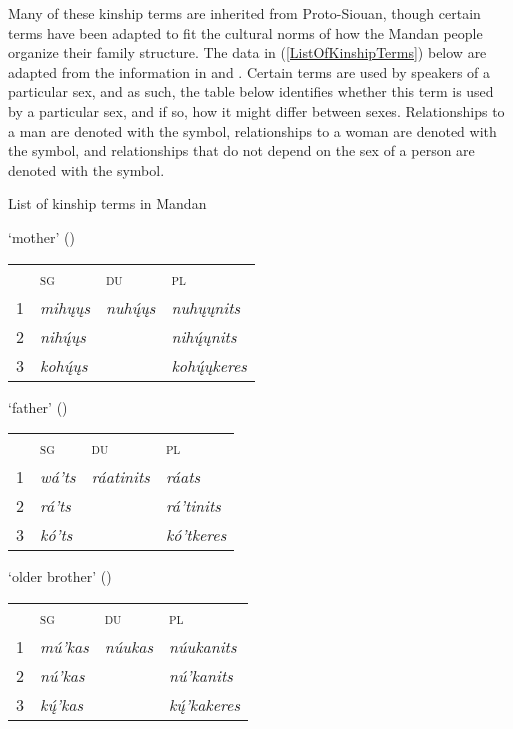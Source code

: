 Many of these kinship terms are inherited from Proto-Siouan, though certain terms have been adapted to fit the cultural norms of how the Mandan people organize their family structure. The data in (\ref{ListOfKinshipTerms}) below are adapted from the information in \citet[40ff]{bowers1950} and \citet[45]{mixco1997a}. Certain terms are used by speakers of a particular sex, and as such, the table below identifies whether this term is used by a particular sex, and if so, how it might differ between sexes. Relationships to a man are denoted with the {\Male} symbol, relationships to a woman are denoted with the {\Female} symbol, and relationships that do not depend on the sex of a person are denoted with the {\Hermaphrodite} symbol. 


\begin{exe}
\item\label{ListOfKinshipTerms} List of kinship terms in Mandan

\begin{xlist}

\item\label{ListOfKinshipTerms1} `mother' (\Hermaphrodite)

    \begin{tabular}{llll}
    ~ &\textsc{sg}&\textsc{du}& \textsc{pl}\\
    1&  \textit{mihųųs}&\textit{nuhų́ųs}         &\textit{nuhųųnits}\\
    2&  \textit{nihų́ųs}&         &\textit{nihų́ųnits}\\
    3&  \textit{kohų́ųs} &         &\textit{kohų́ųkeres}
    \end{tabular}
    
\item\label{ListOfKinshipTerms2} `father' (\Hermaphrodite)

    \begin{tabular}{llll}
    ~ &\textsc{sg}&\textsc{du}&\textsc{pl}\\
    1&  \textit{wá'ts}&   \textit{ráatinits}                
                                    &\textit{ráats}\\
    2&  \textit{rá'ts}&            &\textit{rá'tinits}\\
    3&  \textit{kó'ts}&            &\textit{kó'tkeres}
    \end{tabular}

   
\item\label{ListOfKinshipTerms3} `older brother' (\Male)

    \begin{tabular}{llll}
    ~ &\textsc{sg}&\textsc{du}&\textsc{pl}\\
    1&  \textit{mú'kas}&   \textit{núukas}                
                                    &\textit{núukanits}\\
    2&  \textit{nú'kas}&            &\textit{nú'kanits}\\
    3&  \textit{kų́'kas}&            &\textit{kų́'kakeres}
    \end{tabular}
    

\end{xlist}
\end{exe}
